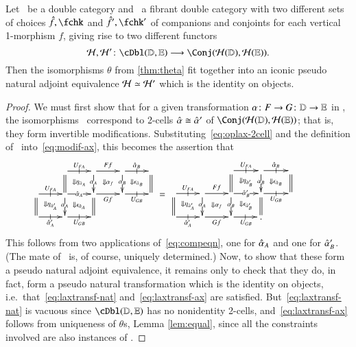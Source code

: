 \documentclass{amsart}
\begin{document}
\begin{lem}\label{thm:h-locfr-uniq}
  Let \lD\ be a double category and \lE\ a fibrant double category
  with two different sets of choices $\fhat,\fchk$ and $\fhat',\fchk'$
  of companions and conjoints for each vertical 1-morphism $f$, giving
  rise to two different functors
  \[\cH,\cH'\maps \cDbl(\lD,\lE)\too \Conj(\cH(\lD),\cH(\lE)).\]
  Then the isomorphisms $\theta$ from \autoref{thm:theta} fit together
  into an iconic pseudo natural adjoint equivalence $\mathcal{H}\simeq \mathcal{H}'$ which is the
  identity on objects.
\end{lem}
\begin{proof}
  We must first show that for a given transformation $\alpha\colon F\to
  G\colon \mathbb{D}\to\mathbb{E}$ in \cDbl, the isomorphisms \th\ correspond to 2-cells $\hat{\alpha} \cong \hat{\alpha}'$ of $\Conj(\cH(\lD),\cH(\lE))$; that is, they form invertible
  modifications.
  Substituting~\eqref{eq:oplax-2cell} and the definition of \th\
  into~\eqref{eq:modif-ax}, this becomes the assertion that
  \begin{equation}
    \vcenter{\xymatrix@R=1.5pc@C=2pc{
        &
        \ar[r]|-@{|}^{U_{FA}}\ar@{=}[d] \ar@{}[dr]|{\Downarrow \eta_{\hat{\alpha}_A}} &
        \ar[r]^{Ff}\ar[d]|{\al_A} \ar@{}[dr]|{\Downarrow \al_f} &
        \ar[r]|-@{|}^{\alhat_B}\ar[d]|{\al_B} \ar@{}[dr]|{\Downarrow \epsilon_{\hat{\alpha}_B}} &
        \ar@{=}[d]\\
        \ar[r]|-@{|}^{U_{FA}} \ar@{=}[d] \ar@{}[dr]|{\Downarrow \eta_{\hat{\alpha}_A'}} &
        \ar[r]|{\alhat_A} \ar[d]|{\al_A} \ar@{}[dr]|{\Downarrow \epsilon_{\hat{\alpha}_A}}&
        \ar[r]_{Gf}  \ar@{=}[d] &
        \ar[r]|-@{|}_{U_{GB}} & \\
        \ar[r]|-@{|}_{\alhat_A'} & \ar[r]|-@{|}_{U_{GB}}&&
      }} \;=\;
    \vcenter{\xymatrix@R=1.5pc@C=2pc{
        && \ar@{=}[d] \ar[r]|-@{|}^{U_{FA}} \ar@{}[dr]|{\Downarrow \eta_{\hat{\alpha}_B'}} &
        \ar[d]|{\al_B} \ar[r]|-@{|}^{\alhat_B} \ar@{}[dr]|{\Downarrow \epsilon_{\hat{\alpha}_B}}
        &
        \ar@{=}[d] &\\
        \ar[r]|-@{|}^{U_{FA}}\ar@{=}[d] \ar@{}[dr]|{\Downarrow \eta_{\hat{\alpha}_A'}} &
        \ar[r]^{Ff}\ar[d]|{\al_A} \ar@{}[dr]|{\Downarrow \al_f} &
        \ar[r]|{\alhat_B'}\ar[d]|{\al_B} \ar@{}[dr]|{\Downarrow \epsilon_{\hat{\alpha}_B'}} &
        \ar@{=}[d] \ar[r]|-@{|}_{U_{GB}}&\\
        \ar[r]|-@{|}_{\alhat_A'} &
        \ar[r]_{Gf} &
        \ar[r]|-@{|}_{U_{GB}} & .
      }}
  \end{equation}
  This follows from two applications of~\eqref{eq:compeqn}, one for
  $\hat{\alpha}_A$ and one for $\hat{\alpha}_B'$.  (The mate of \th\ is, of
  course, uniquely determined.)  Now, to show that these form a pseudo
  natural adjoint equivalence, it remains only to check that they do,
  in fact, form a pseudo natural transformation which is the identity
  on objects, i.e.\ that~\eqref{eq:laxtransf-nat}
  and~\eqref{eq:laxtransf-ax} are satisfied.
  But~\eqref{eq:laxtransf-nat} is vacuous since $\cDbl(\lD,\lE)$ has
  no nonidentity 2-cells, and~\eqref{eq:laxtransf-ax} follows from uniqueness of $\theta$s,
  Lemma \ref{lem:equal}, since all the constraints involved are
  also instances of \th.
\end{proof}
\end{document}
